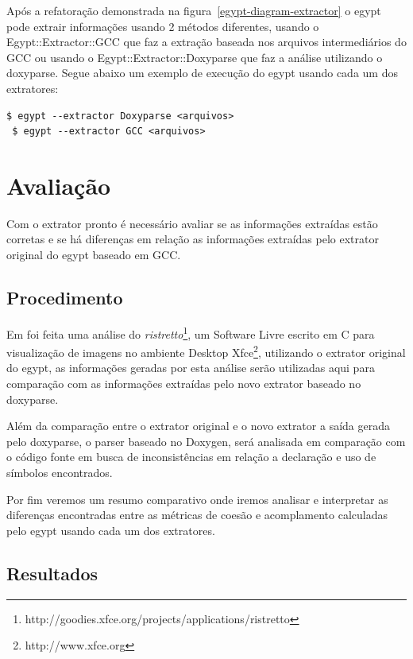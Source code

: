 Após a refatoração demonstrada na figura~\ref{egypt-diagram-extractor} o egypt
pode extrair informações usando 2 métodos diferentes, usando o
Egypt::Extractor::GCC que faz a extração baseada nos arquivos intermediários do
GCC ou usando o Egypt::Extractor::Doxyparse que faz a análise utilizando o
doxyparse. Segue abaixo um exemplo de execução do egypt usando cada um dos
extratores:

\begin{Verbatim}[frame=single,fontsize=\relsize{-2},fontfamily=courier]
 $ egypt --extractor Doxyparse <arquivos>
 $ egypt --extractor GCC <arquivos>
\end{Verbatim}


\chapter{Avaliação} \label{ch:avaliacao}

Com o extrator pronto é necessário avaliar se as informações extraídas estão
corretas e se há diferenças em relação as informações extraídas pelo extrator
original do egypt baseado em GCC.

\section{Procedimento}

Em \cite{structuralComplexityEvolution} foi feita uma análise do {\it
ristretto}\footnote{http://goodies.xfce.org/projects/applications/ristretto},
um Software Livre escrito em C para visualização de imagens no ambiente Desktop
Xfce\footnote{http://www.xfce.org}, utilizando o extrator original do egypt, as
informações geradas por esta análise serão utilizadas aqui para comparação com
as informações extraídas pelo novo extrator baseado no doxyparse.

Além da comparação entre o extrator original e o novo extrator a saída
gerada pelo doxyparse, o parser baseado no Doxygen, será analisada em
comparação com o código fonte em busca de inconsistências em relação a
declaração e uso de símbolos encontrados.

Por fim veremos um resumo comparativo onde iremos analisar e interpretar as
diferenças encontradas entre as métricas de coesão e acomplamento calculadas
pelo egypt usando cada um dos extratores.

\section{Resultados}

